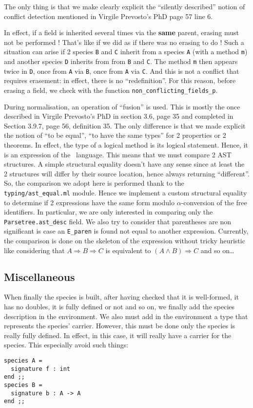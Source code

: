 The only thing is that we make clearly explicit the ``silently
described'' notion of conflict detection mentioned in Virgile
Prevosto's PhD page 57 line 6.

In effect, if a field is inherited several times via the {\bf same}
parent, erasing must not be performed ! That's like if we did as if
there was no erasing to do ! Such a situation can arise if 2 species
{\tt B} and {\tt C} inherit from a species {\tt A} (with a method
{\tt m}) and another species {\tt D} inherits from from {\tt B} and
{\tt C}. The method {\tt m} then appears twice in {\tt D}, once from
{\tt A} via {\tt B}, once from {\tt A} via {\tt C}. And this is not a
conflict that requires erasement: in effect, there is no
``redefinition''. For this reason, before erasing a field, we check
with the function {\tt non\_conflicting\_fields\_p}.

\medskip
During normalisation, an operation of ``fusion'' is used. This is
mostly the once described in Virgile Prevosto's PhD in section 3.6,
page 35 and completed in Section 3.9.7, page 56, definition 35. The
only difference is that we made explicit the notion of ``to be
equal'', ``to have the same types'' for 2 properties or 2 theorems.
In effect, the type of a logical method is its logical
statement. Hence, it is an expression of the \focalize\ language. This
means that we must compare 2 AST structures. A simple structural
equality doesn't have any sense since at least the 2 structures will
differ by their source location, hence always returning ``different''.
So, the comparison we adopt here is performed thank to the
{\tt typing/ast\_equal.ml} module. Hence we implement a custom
structural equality to determine if 2 expressions have the same form
modulo $\alpha$-conversion of the free identifiers. In particular, we
are only interested in comparing only the {\tt Parsetree.ast\_desc}
field. We also try to consider that parentheses are non significant is
case an {\tt E\_paren} is found not equal to another
expression. Currently, the comparison is done on the skeleton of the
expression without tricky heuristic like considering that
$A \Rightarrow B \Rightarrow C$ is equivalent to
$(A \wedge B) \Rightarrow C$ and so on\ldots


\subsection{Miscellaneous}
When finally the species is built, after having checked that it is
well-formed, it has no doubles, it is fully defined or not and so on,
we finally add the species description in the environment. We also
must add in the environment a type that represents the species'
carrier. However, this must be done only the species is really fully
defined. In effect, in this case, it will really have a carrier for
the species. This especially avoid such things:
{\footnotesize
\begin{lstlisting}
species A =
  signature f : int
end ;;
species B =
  signature b : A -> A
end ;;
\end{lstlisting}
}

